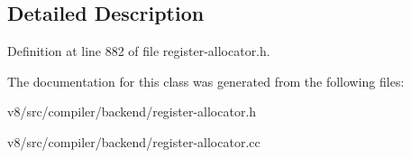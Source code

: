 \subsection{Detailed Description}


Definition at line 882 of file register-\/allocator.\+h.



The documentation for this class was generated from the following files\+:\begin{DoxyCompactItemize}
\item 
v8/src/compiler/backend/register-\/allocator.\+h\item 
v8/src/compiler/backend/register-\/allocator.\+cc\end{DoxyCompactItemize}
